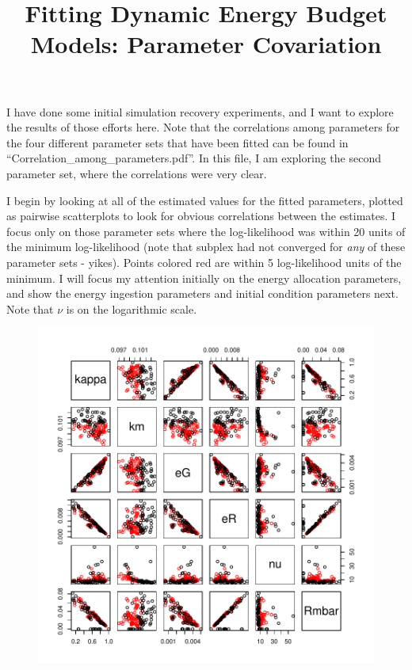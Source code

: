 \documentclass[12pt,reqno,final]{amsart}
\title[DEB fitting notes]{Fitting Dynamic Energy Budget Models:
  Parameter Covariation}
\theoremstyle{plain}
\numberwithin{equation}{part}
\begin{document}
\maketitle

I have done some initial simulation recovery experiments, and I want
to explore the results of those efforts here. Note that the
correlations among parameters for the four different parameter sets
that have been fitted can be found in
``Correlation\_among\_parameters.pdf''. In this file, I am exploring
the second parameter set, where the correlations were very clear.

I begin by looking at all of the estimated values for the fitted
parameters, plotted as pairwise scatterplots to look for obvious
correlations between the estimates. I focus only on those parameter
sets where the log-likelihood was within 20 units of the minimum
log-likelihood (note that subplex had not converged for \emph{any} of
these parameter sets - yikes). Points colored red are within 5
log-likelihood units of the minimum. I will focus my attention
initially on the energy allocation parameters, and show the energy
ingestion parameters and initial condition parameters next. Note that
$\nu$ is on the logarithmic scale.
\begin{figure}
\includegraphics{Solving_the_problem_of_parameter_covariation_3-001}
\end{figure}
\end{document}
